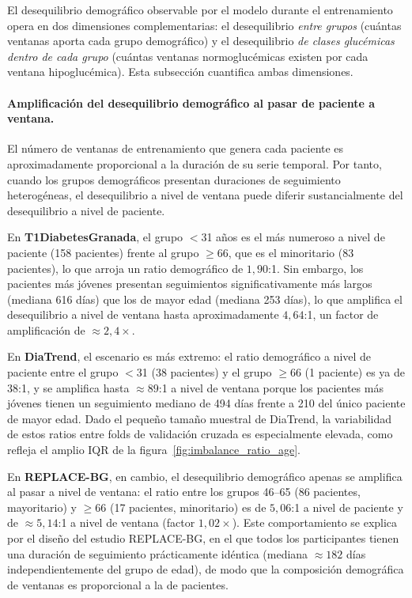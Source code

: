 El desequilibrio demográfico observable por el modelo durante el entrenamiento opera en dos dimensiones complementarias: el desequilibrio \emph{entre grupos} (cuántas ventanas aporta cada grupo demográfico) y el desequilibrio \emph{de clases glucémicas dentro de cada grupo} (cuántas ventanas normoglucémicas existen por cada ventana hipoglucémica). Esta subsección cuantifica ambas dimensiones.

\paragraph{Amplificación del desequilibrio demográfico al pasar de paciente a ventana.}
El número de ventanas de entrenamiento que genera cada paciente es aproximadamente proporcional a la duración de su serie temporal. Por tanto, cuando los grupos demográficos presentan duraciones de seguimiento heterogéneas, el desequilibrio a nivel de ventana puede diferir sustancialmente del desequilibrio a nivel de paciente.

En \textbf{T1DiabetesGranada}, el grupo $<$31 años es el más numeroso a nivel de paciente (158 pacientes) frente al grupo $\geq$66, que es el minoritario (83 pacientes), lo que arroja un ratio demográfico de $1{,}90$:1. Sin embargo, los pacientes más jóvenes presentan seguimientos significativamente más largos (mediana 616 días) que los de mayor edad (mediana 253 días), lo que amplifica el desequilibrio a nivel de ventana hasta aproximadamente $4{,}64$:1, un factor de amplificación de ${\approx}2{,}4\times$.

En \textbf{DiaTrend}, el escenario es más extremo: el ratio demográfico a nivel de paciente entre el grupo $<$31 (38 pacientes) y el grupo $\geq$66 (1 paciente) es ya de $38$:1, y se amplifica hasta ${\approx}89$:1 a nivel de ventana porque los pacientes más jóvenes tienen un seguimiento mediano de 494 días frente a 210 del único paciente de mayor edad. Dado el pequeño tamaño muestral de DiaTrend, la variabilidad de estos ratios entre folds de validación cruzada es especialmente elevada, como refleja el amplio IQR de la figura~\ref{fig:imbalance_ratio_age}.

En \textbf{REPLACE-BG}, en cambio, el desequilibrio demográfico apenas se amplifica al pasar a nivel de ventana: el ratio entre los grupos 46--65 (86 pacientes, mayoritario) y $\geq$66 (17 pacientes, minoritario) es de $5{,}06$:1 a nivel de paciente y de ${\approx}5{,}14$:1 a nivel de ventana (factor $1{,}02\times$). Este comportamiento se explica por el diseño del estudio REPLACE-BG, en el que todos los participantes tienen una duración de seguimiento prácticamente idéntica (mediana ${\approx}182$ días independientemente del grupo de edad), de modo que la composición demográfica de ventanas es proporcional a la de pacientes.

